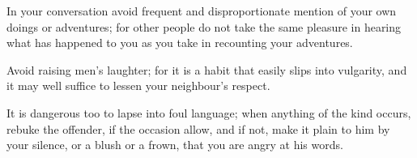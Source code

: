 In your  conversation avoid frequent  and disproportionate mention of  your own
doings or adventures; for other people do not take the same pleasure in hearing
what has happened to you as you take in recounting your adventures.

Avoid  raising  men's laughter;  for  it  is a  habit  that  easily slips  into
vulgarity, and it may well suffice to lessen your neighbour's respect.

It is  dangerous too  to lapse into  foul language; when  anything of  the kind
occurs, rebuke the offender,  if the occasion allow, and if  not, make it plain
to him by your silence, or a blush or a frown, that you are angry at his words.
